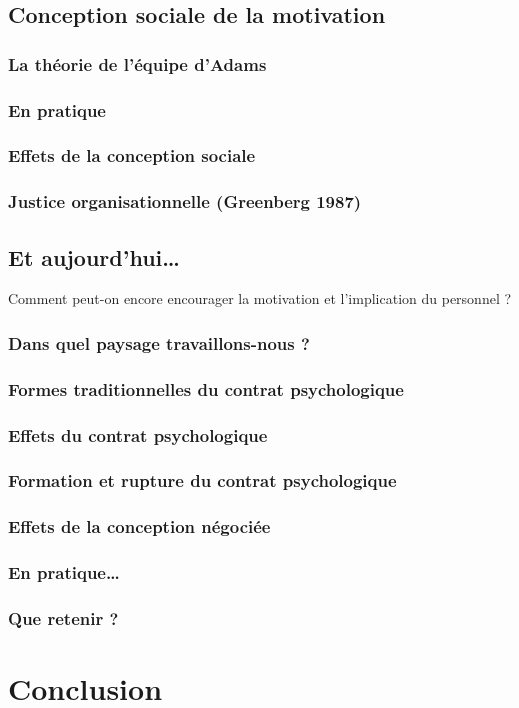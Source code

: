 \documentclass[12pt]{article}
\begin{document}
	\subsection{Conception sociale de la motivation}
		\subsubsection{La théorie de l’équipe d’Adams}
		\subsubsection{En pratique}
		\subsubsection{Effets de la conception sociale}
		\subsubsection{Justice organisationnelle (Greenberg 1987)}
	\subsection{Et aujourd’hui…}
		Comment peut-on encore encourager la motivation et l’implication du personnel ?
		\subsubsection{Dans quel paysage travaillons-nous ?}
		\subsubsection{Formes traditionnelles du contrat psychologique}
		\subsubsection{Effets du contrat psychologique}
		\subsubsection{Formation et rupture du contrat psychologique}
		\subsubsection{Effets de la conception négociée}
		\subsubsection{En pratique…}
		\subsubsection{Que retenir ?}

\section{Conclusion}



\end{document}

